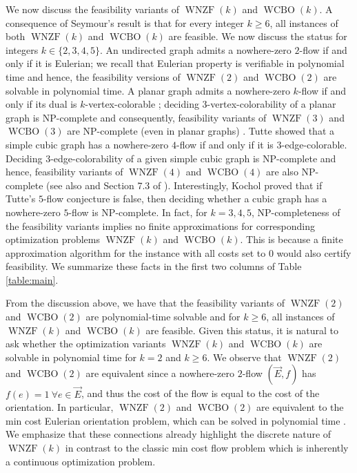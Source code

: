 \documentclass[11pt]{article}
\begin{document}
We now discuss the feasibility variants of $\operatorname{WNZF}(k)$ and $\operatorname{WCBO}(k)$. A consequence of Seymour's result is that for every integer $k\ge 6$, all instances of both $\operatorname{WNZF}(k)$ and $\operatorname{WCBO}(k)$ are feasible. We now discuss the status for integers $k\in \{2,3, 4, 5\}$. 
An undirected graph admits a nowhere-zero $2$-flow if and only if it is Eulerian; we recall that Eulerian property is verifiable in polynomial time and hence, the feasibility versions of $\operatorname{WNZF}(2)$ and $\operatorname{WCBO}(2)$ are solvable in polynomial time. A planar graph admits a nowhere-zero $k$-flow if and only if its dual is $k$-vertex-colorable \cite{jaeger1988nowhere}; deciding $3$-vertex-colorability of a planar graph is NP-complete \cite{garey1974some} and consequently, feasibility variants of $\operatorname{WNZF}(3)$ and $\operatorname{WCBO}(3)$ are NP-complete (even in planar graphs) \cite{kochol1998hypothetical}. 
Tutte \cite{tutte1954contribution} showed that a simple cubic graph has a nowhere-zero $4$-flow if and only if it is $3$-edge-colorable. Deciding $3$-edge-colorability of a given simple cubic graph is NP-complete \cite{holyer1981np} and hence, feasibility variants of $\operatorname{WNZF}(4)$ and $\operatorname{WCBO}(4)$ are also NP-complete (see also \cite{jaeger1979flows} and Section 7.3 of \cite{west2001introduction}). Interestingly, Kochol \cite{kochol1998hypothetical} proved that if Tutte's $5$-flow conjecture is false, then deciding whether a cubic graph has a nowhere-zero $5$-flow is NP-complete. In fact, for $k=3,4,5$, NP-completeness of the feasibility variants implies no finite approximations for corresponding optimization problems $\operatorname{WNZF}(k)$ and $\operatorname{WCBO}(k)$. This is because a finite approximation algorithm for the instance with all costs set to 0 would also certify feasibility.
We summarize these facts in the 
first two columns of Table \ref{table:main}. 



From the discussion above, we have that 
the feasibility variants of $\operatorname{WNZF}(2)$ and $\operatorname{WCBO}(2)$ are polynomial-time solvable and for $k\ge 6$, all instances of $\operatorname{WNZF}(k)$ and $\operatorname{WCBO}(k)$ are feasible. Given this status, it is natural to ask whether the optimization variants $\operatorname{WNZF}(k)$ and $\operatorname{WCBO}(k)$ are solvable in polynomial time for $k=2$ and $k\ge 6$. We observe that $\operatorname{WNZF}(2)$ and $\operatorname{WCBO}(2)$ are equivalent since a nowhere-zero $2$-flow $(\vec{E},f)$ has $f(e)=1\ \forall e\in\vec{E}$, and thus the cost of the flow is equal to the cost of the orientation. 
In particular, $\operatorname{WNZF}(2)$ and $\operatorname{WCBO}(2)$ are equivalent to the min cost Eulerian orientation problem, which can be solved in polynomial time \cite{win1989windy}. 
We emphasize that these connections already highlight the discrete nature of $\operatorname{WNZF}(k)$ in contrast to the classic min cost flow problem which is inherently a continuous optimization problem. 
\end{document}
